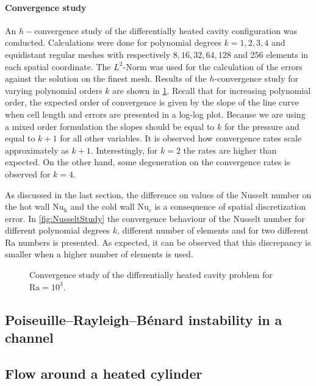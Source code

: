 \paragraph{Convergence study}\label{ssec:ConvStudyHeatedCavity}
An $h-$convergence study of the differentially heated cavity configuration was conducted. Calculations were done for polynomial degrees $k = {1,2,3,4}$ and equidistant regular meshes with respectively $8, 16, 32, 64, 128$ and $256$ elements in each spatial coordinate.  The $L^2$-Norm was used for the calculation of the errors against the solution on the finest mesh. Results of the $h$-convergence study for varying polynomial orders $k$ are shown in \cref{fig:ConvergenceDHC}. Recall that for increasing polynomial order, the expected order of convergence is given by the slope of the line curve when cell length and errors are presented in a log-log plot. Because we are using a mixed order formulation the slopes should be equal to $k$ for the pressure and equal to $k+1$ for all other variables.  It is observed how convergence rates scale approximately as $k+1$. Interestingly, for $k=2$ the rates are higher than expected. On the other hand, some degeneration on the convergence rates is observed for $k = 4$.

As discussed in the last section, the difference on values of the Nusselt number on the hot wall $\text{Nu}_\text{h}$ and the cold wall $\text{Nu}_c$ is a consequence of spatial discretization error. In \cref{fig:NusseltStudy} the convergence behaviour of the Nusselt number for different polynomial degrees $k$, different number of elements and for two different Ra numbers is presented. As expected, it can be observed that this discrepancy is smaller when a higher number of elements is used. 


\begin{figure}[t!]
	\centering
	\pgfplotsset{width=0.34\textwidth, compat=1.3}
	\caption{Convergence study of the differentially heated cavity problem for $\text{Ra} = 10^3$.}\label{fig:ConvergenceDHC}
\end{figure}




\subsection{Poiseuille–Rayleigh–Bénard instability in a channel}
\blindtext[5]


\subsection{Flow around a heated cylinder}
